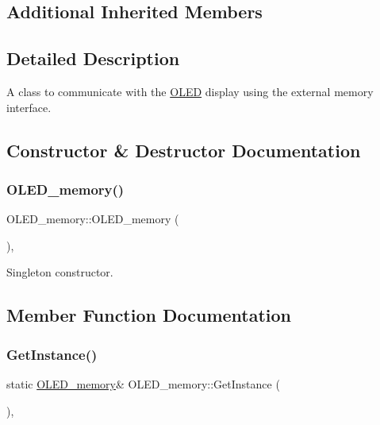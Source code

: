 \subsection*{Additional Inherited Members}


\subsection{Detailed Description}
A class to communicate with the \hyperlink{class_o_l_e_d}{O\+L\+ED} display using the external memory interface. 

\subsection{Constructor \& Destructor Documentation}
\hypertarget{class_o_l_e_d__memory_a237da57c485eed1ba23a9752035f3973}{}\label{class_o_l_e_d__memory_a237da57c485eed1ba23a9752035f3973} 
\subsubsection{\texorpdfstring{O\+L\+E\+D\+\_\+memory()}{OLED\_memory()}}
{\footnotesize\ttfamily O\+L\+E\+D\+\_\+memory\+::\+O\+L\+E\+D\+\_\+memory (\begin{DoxyParamCaption}{ }\end{DoxyParamCaption})\hspace{0.3cm}{\ttfamily [inline]}, {\ttfamily [protected]}}

Singleton constructor. 

\subsection{Member Function Documentation}
\hypertarget{class_o_l_e_d__memory_a8d20efdd852c066b46950bc7b98ff368}{}\label{class_o_l_e_d__memory_a8d20efdd852c066b46950bc7b98ff368} 
\subsubsection{\texorpdfstring{Get\+Instance()}{GetInstance()}}
{\footnotesize\ttfamily static \hyperlink{class_o_l_e_d__memory}{O\+L\+E\+D\+\_\+memory}\& O\+L\+E\+D\+\_\+memory\+::\+Get\+Instance (\begin{DoxyParamCaption}{ }\end{DoxyParamCaption})\hspace{0.3cm}{\ttfamily [inline]}, {\ttfamily [static]}}

